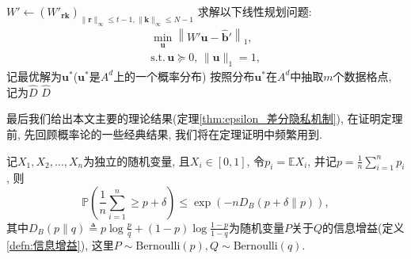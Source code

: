 \begin{algorithm}[hbtp]
\begin{algorithmic}[1]
  \STATE $W' \leftarrow \left(W'_{\mathbf{rk}}\right)_{\|\mathbf{r}\|_{\infty} \le t-1,
  \|\mathbf{k}\|_{\infty} \le N-1}$
  \STATE 求解以下线性规划问题: 
  \begin{align*}
    \min_{\mathbf{u}} \left\| W'\mathbf{u} - \hat{\mathbf{b}}'\right\|_{1}, \\
    \text{s.t.}\, \mathbf{u} \succeq 0,\, \|\mathbf{u}\|_1 =1,
  \end{align*}
  记最优解为$\mathbf{u}^*$($\mathbf{u}^*$是$A^d$上的一个概率分布) \label{alg:line:线性规划}
  \STATE 按照分布$\mathbf{u}^*$在$A^d$中抽取$m$个数据格点, 记为$\hat{D}$ \label{alg:line:生成合成数据库}
  \RETURN $\hat{D}$
\end{algorithmic}
\end{algorithm}

最后我们给出本文主要的理论结果(定理\ref{thm:epsilon_差分隐私机制}), 在证明定理前, 先回顾概率论的一些经典结果, 我们将在定理证明中频繁用到.

\begin{thm}
  记$X_1, X_2, \dots, X_n$为独立的随机变量, 且$X_i \in [0, 1]$, 令$p_i = \mathbb EX_i$, 并记$p = \frac{1}{n}\sum_{i=1}^n p_i$, 则
  \[
    \mathbb P\left(\frac{1}{n}\sum_{i=1}^n \ge p + \delta \right) \le \exp\left(-n D_B(p+\delta\|p)\right),
  \]
  其中$D_B(p\|q) \triangleq p\log\frac{p}{q} + (1-p)\log\frac{1-p}{1-q}$为随机变量$P$关于$Q$的信息增益(定义\ref{defn:信息增益}), 这里$P\sim \mathrm{Bernoulli}(p), Q\sim\mathrm{Bernoulli}(q)$.
\end{thm}

